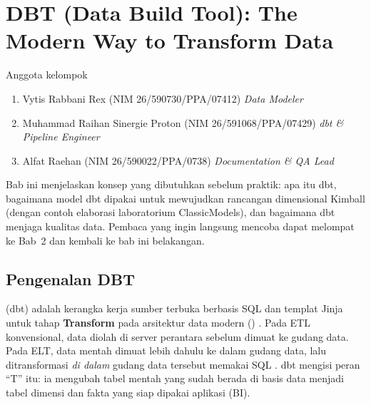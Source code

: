 \chapter{DBT (Data Build Tool): The Modern Way to Transform Data}\label{chap:konsep}
\begin{mybox}{Anggota kelompok}
\begin{enumerate}
    \itemsep0em
    \item Vytis Rabbani Rex (NIM 26/590730/PPA/07412) \textendash{} \textit{Data Modeler}
    \item Muhammad Raihan Sinergie Proton (NIM 26/591068/PPA/07429) \textendash{} \textit{dbt \& Pipeline Engineer}
    \item Alfat Raehan (NIM 26/590022/PPA/0738) \textendash{} \textit{Documentation \& QA Lead}
\end{enumerate}
\end{mybox}

Bab ini menjelaskan konsep yang dibutuhkan sebelum praktik: apa itu dbt, bagaimana model dbt dipakai untuk mewujudkan rancangan dimensional Kimball (dengan contoh elaborasi laboratorium ClassicModels), dan bagaimana dbt menjaga kualitas data. Pembaca yang ingin langsung mencoba dapat melompat ke Bab~2 dan kembali ke bab ini belakangan.

\section{Pengenalan DBT}\label{sec:pengenalan}
 (dbt) adalah kerangka kerja sumber terbuka berbasis SQL dan templat Jinja untuk tahap \textbf{Transform} pada arsitektur data modern  () \citep{handy2017,dbtdocs}. Pada ETL konvensional, data diolah di server perantara sebelum dimuat ke gudang data. Pada ELT, data mentah dimuat lebih dahulu ke dalam gudang data, lalu ditransformasi \emph{di dalam} gudang data tersebut memakai SQL \citep{reis2022}. dbt mengisi peran ``T'' itu: ia mengubah tabel mentah yang sudah berada di basis data menjadi tabel dimensi dan fakta yang siap dipakai aplikasi  (BI).

